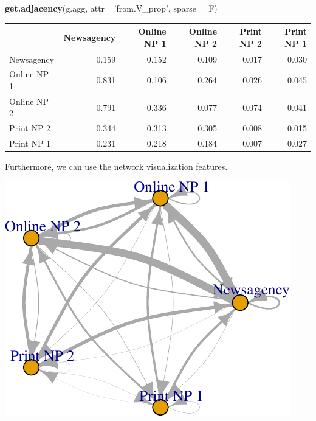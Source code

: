 \documentclass[]{article}
\newenvironment{Shaded}{\begin{snugshade}}{\end{snugshade}}
\newcommand{\KeywordTok}[1]{\textcolor[rgb]{0.13,0.29,0.53}{\textbf{{#1}}}}
\newcommand{\DataTypeTok}[1]{\textcolor[rgb]{0.13,0.29,0.53}{{#1}}}
\newcommand{\DecValTok}[1]{\textcolor[rgb]{0.00,0.00,0.81}{{#1}}}
\newcommand{\FloatTok}[1]{\textcolor[rgb]{0.00,0.00,0.81}{{#1}}}
\newcommand{\StringTok}[1]{\textcolor[rgb]{0.31,0.60,0.02}{{#1}}}
\newcommand{\NormalTok}[1]{{#1}}
\begin{document}
\begin{Shaded}
\begin{Highlighting}[]
\KeywordTok{get.adjacency}\NormalTok{(g.agg, }\DataTypeTok{attr=} \StringTok{'from.V_prop'}\NormalTok{, }\DataTypeTok{sparse =} \NormalTok{F)}
\end{Highlighting}
\end{Shaded}

\begin{longtable}[c]{@{}lrrrrr@{}}
\toprule
& Newsagency & Online NP 1 & Online NP 2 & Print NP 2 & Print NP
1\tabularnewline
\midrule
\endhead
Newsagency & 0.159 & 0.152 & 0.109 & 0.017 & 0.030\tabularnewline
Online NP 1 & 0.831 & 0.106 & 0.264 & 0.026 & 0.045\tabularnewline
Online NP 2 & 0.791 & 0.336 & 0.077 & 0.074 & 0.041\tabularnewline
Print NP 2 & 0.344 & 0.313 & 0.305 & 0.008 & 0.015\tabularnewline
Print NP 1 & 0.231 & 0.218 & 0.184 & 0.007 & 0.027\tabularnewline
\bottomrule
\end{longtable}

Furthermore, we can use the network visualization features.

\begin{Shaded}
\end{Shaded}

\begin{center}\includegraphics{vignette_files/figure-latex/unnamed-chunk-20-1} \end{center}
\end{document}

